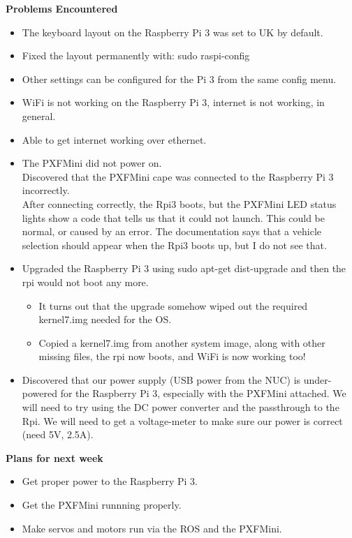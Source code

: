 \documentclass[compsoc,draftclsnofoot,onecolumn,10pt]{IEEEtran}
\begin{document}
\textbf{Problems Encountered}
\begin{itemize}
    \item The keyboard layout on the Raspberry Pi 3 was set to UK by default.
    \item Fixed the layout permanently with: sudo raspi-config
    \item Other settings can be configured for the Pi 3 from the same config menu.
    \item WiFi is not working on the Raspberry Pi 3, internet is not working, in general.
    \item Able to get internet working over ethernet.
    \item The PXFMini did not power on.\\
    Discovered that the PXFMini cape was connected to the Raspberry Pi 3 incorrectly.\\
    After connecting correctly, the Rpi3 boots, but the PXFMini LED status lights show a code that tells us that it could not launch. This could be normal, or caused by an error. The documentation says that a vehicle selection should appear when the Rpi3 boots up, but I do not see that.
    \item Upgraded the Raspberry Pi 3 using sudo apt-get dist-upgrade and then the rpi would not boot any more.
    \begin{itemize}
        \item It turns out that the upgrade somehow wiped out the required kernel7.img needed for the OS.
        \item Copied a kernel7.img from another system image, along with other missing files, the rpi now boots, and WiFi is now working too!
    \end{itemize}
    \item Discovered that our power supply (USB power from the NUC) is under-powered for the Raspberry Pi 3, especially with the PXFMini attached. We will need to try using the DC power converter and the passthrough to the Rpi. We will need to get a voltage-meter to make sure our power is correct (need 5V, 2.5A).
\end{itemize}

\textbf{Plans for next week}
\begin{itemize}
    \item Get proper power to the Raspberry Pi 3.
    \item Get the PXFMini runnning properly.
    \item Make servos and motors run via the ROS and the PXFMini.
\end{itemize}
\end{document}

